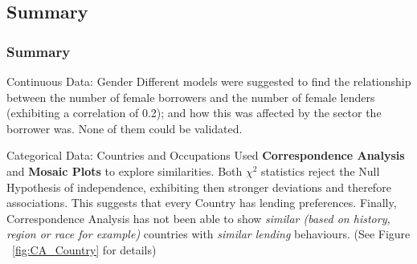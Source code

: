 \documentclass{beamer}
\begin{document}

\subsection{Summary}
\begin{frame}\frametitle{Summary}
\footnotesize{
\begin{block}{Continuous Data: Gender}
Different models were suggested to find the relationship between the number of female borrowers and the number of female lenders (exhibiting a correlation of 0.2); and how this was affected by the sector the borrower was. None of them could be validated.
\end{block}

\begin{block}{Categorical Data: Countries and Occupations}
Used \textbf{Correspondence Analysis} and \textbf{Mosaic Plots} to explore similarities.
Both $\chi^2$ statistics reject the Null Hypothesis of independence, exhibiting then stronger deviations and therefore associations. This suggests that every Country has lending preferences. Finally, Correspondence Analysis has not been able to show \textit{similar (based on history, region or race for example)} countries with \textit{similar lending} behaviours. (See Figure ~\ref{fig:CA_Country} for details)
\end{block}
}
\end{frame}
\end{document}
